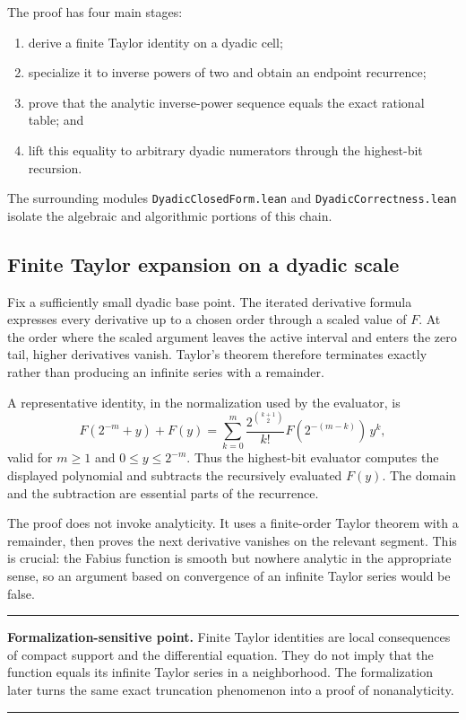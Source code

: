 \documentclass[11pt,oneside]{article}
\theoremstyle{definition}
\theoremstyle{remark}
\newenvironment{boxedremark}{%
  \par\smallskip\noindent\begin{center}\begin{minipage}{0.94\textwidth}%
  \color{black}\hrule\vspace{0.6em}\small
}{%
  \vspace{0.6em}\hrule\end{minipage}\end{center}\smallskip
}
\begin{document}
The proof has four main stages:
\begin{enumerate}
  \item derive a finite Taylor identity on a dyadic cell;
  \item specialize it to inverse powers of two and obtain an endpoint recurrence;
  \item prove that the analytic inverse-power sequence equals the exact rational table; and
  \item lift this equality to arbitrary dyadic numerators through the highest-bit recursion.
\end{enumerate}
The surrounding modules \nolinkurl{DyadicClosedForm.lean} and \nolinkurl{DyadicCorrectness.lean} isolate the algebraic and algorithmic portions of this chain.

\subsection{Finite Taylor expansion on a dyadic scale}
Fix a sufficiently small dyadic base point.  The iterated derivative formula expresses every derivative up to a chosen order through a scaled value of \(F\).  At the order where the scaled argument leaves the active interval and enters the zero tail, higher derivatives vanish.  Taylor's theorem therefore terminates exactly rather than producing an infinite series with a remainder.

A representative identity, in the normalization used by the evaluator, is
\[
  F(2^{-m}+y)+F(y)
  =\sum_{k=0}^{m}
    \frac{2^{\binom{k+1}{2}}}{k!}
    F(2^{-(m-k)})\,y^k,
\]
valid for \(m\geq1\) and \(0\leq y\leq2^{-m}\).  Thus the highest-bit evaluator computes the displayed polynomial and subtracts the recursively evaluated \(F(y)\).  The domain and the subtraction are essential parts of the recurrence.

The proof does not invoke analyticity.  It uses a finite-order Taylor theorem with a remainder, then proves the next derivative vanishes on the relevant segment.  This is crucial: the Fabius function is smooth but nowhere analytic in the appropriate sense, so an argument based on convergence of an infinite Taylor series would be false.

\begin{boxedremark}\textbf{Formalization-sensitive point.}\space
Finite Taylor identities are local consequences of compact support and the differential equation.  They do not imply that the function equals its infinite Taylor series in a neighborhood.  The formalization later turns the same exact truncation phenomenon into a proof of nonanalyticity.
\end{boxedremark}
\end{document}
